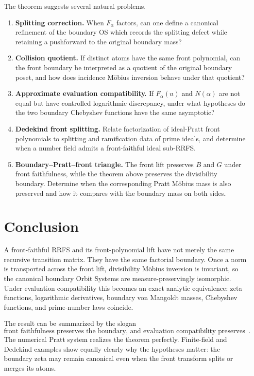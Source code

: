 \documentclass[11pt]{article}
\begin{document}
The theorem suggests several natural problems.

\begin{enumerate}
\item \textbf{Splitting correction.} When $F_\alpha$ factors, can one define a canonical refinement of the boundary OS which records the splitting defect while retaining a pushforward to the original boundary mass?

\item \textbf{Collision quotient.} If distinct atoms have the same front polynomial, can the front boundary be interpreted as a quotient of the original boundary poset, and how does incidence M\"obius inversion behave under that quotient?

\item \textbf{Approximate evaluation compatibility.} If $F_\alpha(u)$ and $N(\alpha)$ are not equal but have controlled logarithmic discrepancy, under what hypotheses do the two boundary Chebyshev functions have the same asymptotic?

\item \textbf{Dedekind front splitting.} Relate factorization of ideal-Pratt front polynomials to splitting and ramification data of prime ideals, and determine when a number field admits a front-faithful ideal sub-RRFS.

\item \textbf{Boundary--Pratt--front triangle.} The front lift preserves $B$ and $G$ under front faithfulness, while the theorem above preserves the divisibility boundary. Determine when the corresponding Pratt M\"obius mass is also preserved and how it compares with the boundary mass on both sides.
\end{enumerate}

\section{Conclusion}

A front-faithful RRFS and its front-polynomial lift have not merely the same recursive transition matrix. They have the same factorial boundary. Once a norm is transported across the front lift, divisibility M\"obius inversion is invariant, so the canonical boundary Orbit Systems are measure-preservingly isomorphic. Under evaluation compatibility this becomes an exact analytic equivalence: zeta functions, logarithmic derivatives, boundary von Mangoldt masses, Chebyshev functions, and prime-number laws coincide.

The result can be summarized by the slogan
\[
\boxed{
\text{front faithfulness preserves the boundary, and evaluation compatibility preserves its arithmetic scale}.}
\]
The numerical Pratt system realizes the theorem perfectly. Finite-field and Dedekind examples show equally clearly why the hypotheses matter: the boundary zeta may remain canonical even when the front transform splits or merges its atoms.
\end{document}
